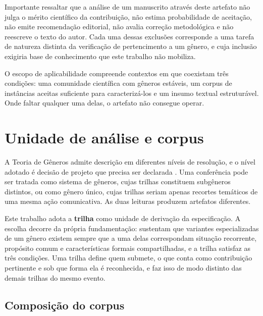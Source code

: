 Importante ressaltar que a análise de um manuscrito através deste artefato não julga o mérito científico da contribuição, não estima probabilidade de aceitação, não emite recomendação editorial, não avalia correção metodológica e não reescreve o texto do autor. Cada uma dessas exclusões corresponde a uma tarefa de natureza distinta da verificação de pertencimento a um gênero, e cuja inclusão exigiria base de conhecimento que este trabalho não mobiliza.

O escopo de aplicabilidade compreende contextos em que coexistam três condições: uma comunidade científica com gêneros estáveis, um corpus de instâncias aceitas suficiente para caracterizá-los e um insumo textual estruturável. Onde faltar qualquer uma delas, o artefato não consegue operar.


\section{Unidade de análise e corpus}
\label{sec:unidade}

A Teoria de Gêneros admite descrição em diferentes níveis de resolução, e o nível adotado é decisão de projeto que precisa ser declarada \cite{GenreRepertoire}. Uma conferência pode ser tratada como sistema de gêneros, cujas trilhas constituem subgêneros distintos, ou como gênero único, cujas trilhas seriam apenas recortes temáticos de uma mesma ação comunicativa. As duas leituras produzem artefatos diferentes.

Este trabalho adota a \textbf{trilha} como unidade de derivação da especificação. A escolha decorre da própria fundamentação:  sustentam que variantes especializadas de um gênero existem sempre que a uma delas correspondam situação recorrente, propósito comum e características formais compartilhadas, e a trilha satisfaz as três condições. Uma trilha define quem submete, o que conta como contribuição pertinente e sob que forma ela é reconhecida, e faz isso de modo distinto das demais trilhas do mesmo evento. 



\subsection*{Composição do corpus}

